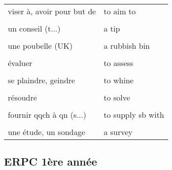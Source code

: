 \documentclass[
  10pt,
]{article}
\begin{document}
\begin{longtable}{ll}
viser à, avoir pour but de & to aim to\\

\cellcolor{gray!6}{gâcher} & \cellcolor{gray!6}{to waste}\\

un conseil (t...) & a tip\\

\cellcolor{gray!6}{un conseil (a...)} & \cellcolor{gray!6}{advice}\\

une poubelle (UK) & a rubbish bin\\

\cellcolor{gray!6}{une poubelle (US)} & \cellcolor{gray!6}{a trash can}\\

évaluer & to assess\\

\cellcolor{gray!6}{réparer} & \cellcolor{gray!6}{to fix}\\

se plaindre, geindre & to whine\\

\cellcolor{gray!6}{stupéfier, "scotcher"} & \cellcolor{gray!6}{to blow}\\

résoudre & to solve\\

\cellcolor{gray!6}{fournir qqch à qn (p...)} & \cellcolor{gray!6}{to provide sb with}\\

fournir qqch à qn (s...) & to supply sb with\\

\cellcolor{gray!6}{actuel} & \cellcolor{gray!6}{current}\\

une étude, un sondage & a survey\\
\bottomrule
\end{longtable}

\hypertarget{erpc-1uxe8re-annuxe9e}{%
\subsection{ERPC 1ère année}\label{erpc-1uxe8re-annuxe9e}}
\end{document}

